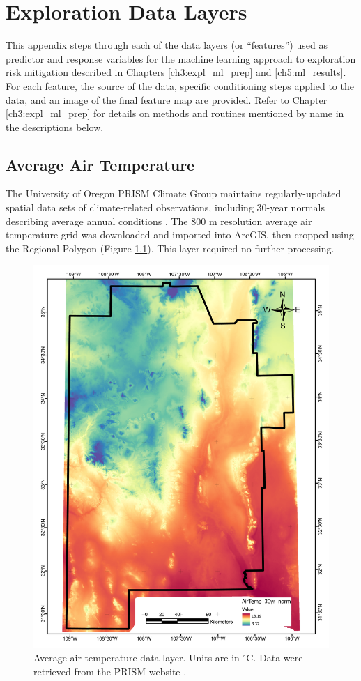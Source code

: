 \chapter{Exploration Data Layers}\label{app:A_data_layers}

This appendix steps through each of the data layers (or ``features'') used as predictor and response variables for the machine learning approach to exploration risk mitigation described in Chapters \ref{ch3:expl_ml_prep} and \ref{ch5:ml_results}. For each feature, the source of the data, specific conditioning steps applied to the data, and an image of the final feature map are provided. Refer to Chapter \ref{ch3:expl_ml_prep} for details on methods and routines mentioned by name in the descriptions below.
\vfill
\pagebreak

\section{Average Air Temperature}\label{app:dl_air_temp}
The University of Oregon PRISM Climate Group maintains regularly-updated spatial data sets of climate-related observations, including 30-year normals describing average annual conditions \citep{daly_physiographically_2008, prism_prism_2021}. The 800 m resolution average air temperature grid was downloaded and imported into ArcGIS, then cropped using the Regional Polygon (Figure \ref{fig:feat_airtemp}). This layer required no further processing.

\begin{figure}[H]
\centering
\includegraphics[width=0.75\linewidth]{templates/images/Figure-AvgAirTemp.pdf}
\caption[Average air temperature data layer]{Average air temperature data layer. Units are in $^\circ$C. Data were retrieved from the PRISM website \protect\citep{prism_prism_2021}.}
\label{fig:feat_airtemp}
\end{figure}
\pagebreak

